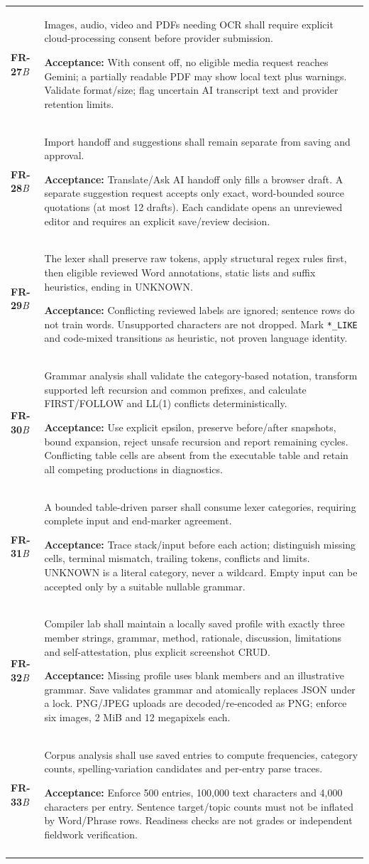 \documentclass[11pt,a4paper]{article}
\newcommand{\requirement}[4]{\textbf{#1}\newline\textit{#2} & #3\par\smallskip\textbf{Acceptance:} #4\\\addlinespace}
\begin{document}
\begin{longtable}{L{1.8cm}L{12.5cm}}
\requirement{FR-27}{B}
{Images, audio, video and PDFs needing OCR shall require explicit cloud-processing consent before provider submission.}
{With consent off, no eligible media request reaches Gemini; a partially readable PDF may show local text plus warnings. Validate format/size; flag uncertain AI transcript text and provider retention limits.}
\requirement{FR-28}{B}
{Import handoff and suggestions shall remain separate from saving and approval.}
{Translate/Ask AI handoff only fills a browser draft. A separate suggestion request accepts only exact, word-bounded source quotations (at most 12 drafts). Each candidate opens an unreviewed editor and requires an explicit save/review decision.}
\requirement{FR-29}{B}
{The lexer shall preserve raw tokens, apply structural regex rules first, then eligible reviewed Word annotations, static lists and suffix heuristics, ending in UNKNOWN.}
{Conflicting reviewed labels are ignored; sentence rows do not train words. Unsupported characters are not dropped. Mark \nolinkurl{*_LIKE} and code-mixed transitions as heuristic, not proven language identity.}
\requirement{FR-30}{B}
{Grammar analysis shall validate the category-based notation, transform supported left recursion and common prefixes, and calculate FIRST/FOLLOW and LL(1) conflicts deterministically.}
{Use explicit epsilon, preserve before/after snapshots, bound expansion, reject unsafe recursion and report remaining cycles. Conflicting table cells are absent from the executable table and retain all competing productions in diagnostics.}
\requirement{FR-31}{B}
{A bounded table-driven parser shall consume lexer categories, requiring complete input and end-marker agreement.}
{Trace stack/input before each action; distinguish missing cells, terminal mismatch, trailing tokens, conflicts and limits. UNKNOWN is a literal category, never a wildcard. Empty input can be accepted only by a suitable nullable grammar.}
\requirement{FR-32}{B}
{Compiler lab shall maintain a locally saved profile with exactly three member strings, grammar, method, rationale, discussion, limitations and self-attestation, plus explicit screenshot CRUD.}
{Missing profile uses blank members and an illustrative grammar. Save validates grammar and atomically replaces JSON under a lock. PNG/JPEG uploads are decoded/re-encoded as PNG; enforce six images, 2 MiB and 12 megapixels each.}
\requirement{FR-33}{B}
{Corpus analysis shall use saved entries to compute frequencies, category counts, spelling-variation candidates and per-entry parse traces.}
{Enforce 500 entries, 100,000 text characters and 4,000 characters per entry. Sentence target/topic counts must not be inflated by Word/Phrase rows. Readiness checks are not grades or independent fieldwork verification.}

\end{longtable}
\end{document}
